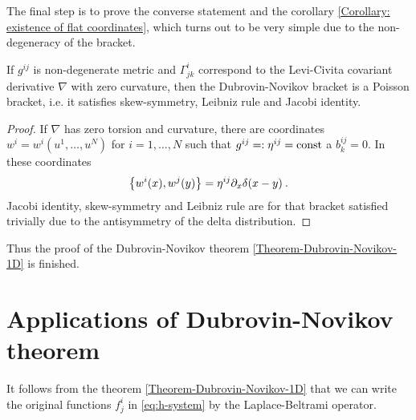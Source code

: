 The final step is to prove the converse statement and the corollary \vref{Corollary: existence of flat coordinates}, which turns out to be very simple due to the non-degeneracy of the bracket. 

\begin{lemma}
    If $g^{ij}$ is non-degenerate metric and $\Gamma^i_{jk}$ correspond to the Levi-Civita covariant derivative $\nabla$ with zero curvature, then the Dubrovin-Novikov bracket is a Poisson bracket, i.e. it satisfies skew-symmetry, Leibniz rule and Jacobi identity.
\end{lemma}

\begin{proof}
    If $\nabla$ has zero torsion and curvature, there are coordinates $w^i=w^i(u^1,\dots,u^N)$ for $i=1,\dots,N$ such that $g^{ij} =: \eta^{ij} =\mathrm{const}$ a $b^{ij}_k = 0$. In these coordinates
    \begin{align}
        \left \lbrace w^i(x),w^j(y) \right \rbrace = \eta^{ij} \partial_x \delta(x-y) \:.
    \end{align}
    Jacobi identity, skew-symmetry and Leibniz rule are for that bracket satisfied trivially due to the antisymmetry of the delta distribution.
\end{proof}
Thus the proof of the Dubrovin-Novikov theorem \vref{Theorem-Dubrovin-Novikov-1D} is finished.

\section{Applications of Dubrovin-Novikov theorem}

It follows from the theorem \vref{Theorem-Dubrovin-Novikov-1D} that we can write the original functions $f^{i}_j$ in \eqref{eq:h-system} by the Laplace-Beltrami operator.

